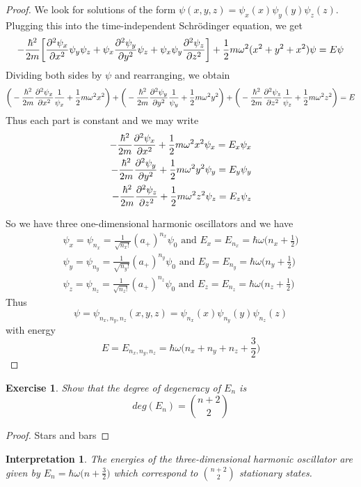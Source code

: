 \documentclass[12pt]{amsart}
\newtheorem{intp}[thm]{Interpretation}
\newtheorem{ex}[thm]{Exercise}
\newcommand{\sch}{Schr\"{o}dinger }
\newcommand{\om}{\omega}
\begin{document}
\begin{proof}
We look for solutions of the form $\psi(x,y,z) = \psi_x(x) \psi_y(y) \psi_z(z)$. Plugging this into the time-independent \sch equation, we get $$-\frac{\hbar^2}{2m}\bigg[ \pdv[2]{\psi_x}{x}\psi_y \psi_z + \psi_x \pdv[2]{\psi_y}{y} \psi_z  + \psi_x \psi_y \pdv[2]{\psi_z}{z} \bigg] + \frac{1}{2}m \omega^2(x^2 + y^2 + x^2) \psi = E\psi$$ Dividing both sides by $\psi$ and rearranging, we obtain $$\bigg(-\frac{\hbar^2}{2m}\pdv[2]{\psi_x}{x}\frac{1}{\psi_x} + \frac{1}{2}m \om^2x^2\bigg) + \bigg(-\frac{\hbar^2}{2m}\pdv[2]{\psi_y}{y}\frac{1}{\psi_y} + \frac{1}{2}m \om^2y^2\bigg)+ \bigg(-\frac{\hbar^2}{2m}\pdv[2]{\psi_z}{z}\frac{1}{\psi_z} + \frac{1}{2}m \om^2z^2\bigg) = E $$ 
Thus each part is constant and we may write 
\begin{align*}
-\frac{\hbar^2}{2m}\pdv[2]{\psi_x}{x} + \frac{1}{2}m \om^2x^2\psi_x = E_x\psi_x \\ 
-\frac{\hbar^2}{2m}\pdv[2]{\psi_y}{y} + \frac{1}{2}m \om^2y^2\psi_y = E_y\psi_y \\
-\frac{\hbar^2}{2m}\pdv[2]{\psi_z}{z} + \frac{1}{2}m \om^2z^2\psi_z = E_z\psi_z
\end{align*}

So we have three one-dimensional harmonic oscillators and we have 
\begin{align*}
\psi_x = \psi_{n_x} = \frac{1}{\sqrt{{n_x}!}}(a_+)^{n_x} \psi_0 \text{ and } E_x = E_{n_x} = \hbar \om \bigg( n_x +\frac{1}{2}\bigg)\\
\psi_y = \psi_{n_y} = \frac{1}{\sqrt{{n_y}!}}(a_+)^{n_y} \psi_0 \text{ and } E_y = E_{n_y} = \hbar \om \bigg( n_y +\frac{1}{2}\bigg)\\
\psi_z = \psi_{n_z} = \frac{1}{\sqrt{{n_z}!}}(a_+)^{n_z} \psi_0 \text{ and } E_z = E_{n_z} = \hbar \om \bigg( n_z +\frac{1}{2}\bigg)
\end{align*}
Thus $$\psi = \psi_{n_x, n_y, n_z}(x,y,z) = \psi_{n_x}(x)\psi_{n_y}(y)\psi_{n_z}(z)$$ with energy $$E = E_{n_x,n_y, n_z} = \hbar \om \bigg (n_x + n_y + n_z + \frac{3}{2} \bigg)$$
\end{proof}

\begin{ex}
Show that the degree of degeneracy of $E_n$ is $$deg(E_n) = {n+2 \choose 2}$$
\end{ex}

\begin{proof}
Stars and bars
\end{proof}

\begin{intp}
The energies of the three-dimensional harmonic oscillator are given by $E_n = \hbar \om \bigg( n + \frac{3}{2}\bigg)$ which correspond to $ n+2 \choose 2$ stationary states.
\end{intp}
\end{document}
